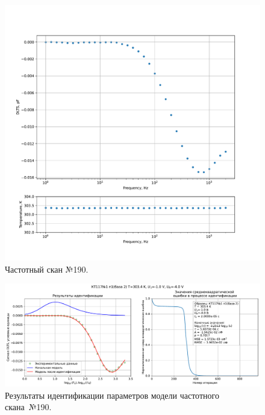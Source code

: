 \begin{figure}[!ht]
    \centering
    \includegraphics[width=1\textwidth]{../plots/КТ117№1_п1(база 2)_2500Гц-1Гц_1пФ_+30С_-1В-4В_200мВ_20мкс_шаг_0,1.pdf}
    \caption{Частотный скан №190.}
    \label{pic:frequency_scan_190}
\end{figure}

\begin{figure}[!ht]
    \centering
    \includegraphics[width=1\textwidth]{../plots/КТ117№1_п1(база 2)_2500Гц-1Гц_1пФ_+30С_-1В-4В_200мВ_20мкс_шаг_0,1_model.pdf}
    \caption{Результаты идентификации параметров модели частотного скана~№190.}
    \label{pic:frequency_scan_model190}
\end{figure}

\pagebreak


